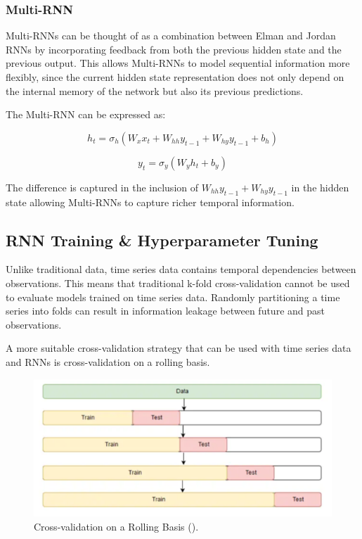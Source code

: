 \documentclass[conference]{IEEEtran}
\begin{document}
\subsubsection{\textbf{Multi-RNN}}

Multi-RNNs can be thought of as a combination between Elman and Jordan RNNs by incorporating feedback from both the previous hidden state and the previous output. This allows Multi-RNNs to model sequential information more flexibly, since the current hidden state representation does not only depend on the internal memory of the network but also its previous predictions.

The Multi-RNN can be expressed as:

$$
h_t = \sigma_h(W_x x_t + W_{hh} y_{t-1} + W_{hy} y_{t-1} + b_h)
$$

$$
y_t = \sigma_y(W_y h_t + b_y)
$$

The difference is captured in the inclusion of $W_{hh} y_{t-1} + W_{hy} y_{t-1}$ in the hidden state allowing Multi-RNNs to capture richer temporal information.

\subsection{\textbf{RNN Training \& Hyperparameter Tuning}}

Unlike traditional data, time series data contains temporal dependencies between observations. This means that traditional k-fold cross-validation cannot be used to evaluate models trained on time series data. Randomly partitioning a time series into folds can result in information leakage between future and past observations.

A more suitable cross-validation strategy that can be used with time series data and RNNs is cross-validation on a rolling basis.

\begin{figure}[H]
  \centering
  \includegraphics[width=0.65\linewidth]{images/rolling_cv.png}
  \caption{Cross-validation on a Rolling Basis (\cite{time_series_cv}).}
  \label{fig:rolling_cv}
\end{figure}
\end{document}
